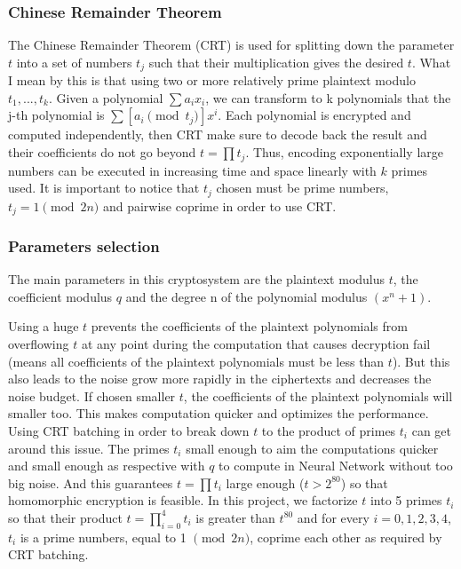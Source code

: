 \documentclass[A4paper,12pt]{article}
\begin{document}
	\subsubsection{Chinese Remainder Theorem}
	
The Chinese Remainder Theorem (CRT)\cite{report} is used for splitting down the parameter $t$ into a set of numbers $t_j$ such that their multiplication gives the desired $t$. What I mean by this is that using two or more relatively prime plaintext modulo $t_1, ..., t_k$. Given a polynomial $\sum a_i x_i$, we can transform to k polynomials that the j-th polynomial is $\sum [a_i \pmod {t_j}]x^i$. Each polynomial is encrypted and computed independently, then CRT make sure to decode back the result and their coefficients do not go beyond $t = \prod {t_j}$. Thus, encoding exponentially large numbers can be executed in increasing time and space linearly with $k$ primes used. It is important to notice that $t_j$ chosen must be prime numbers, $t_j = 1 \pmod {2n}$ and pairwise coprime in order to use CRT.
	

	\subsubsection{Parameters selection}
The main parameters in this cryptosystem are the plaintext modulus $t$, the coefficient modulus $q$ and the degree n of the polynomial modulus $(x^n + 1)$.

Using a huge $t$ prevents the coefficients of the plaintext polynomials from overflowing $t$ at any point during the computation that causes decryption fail (means all coefficients of the plaintext polynomials must be less than $t$). But this also leads to the noise grow more rapidly in the ciphertexts and decreases the noise budget. If chosen smaller $t$, the coefficients of the plaintext polynomials will smaller too. This makes computation quicker and optimizes the performance. Using CRT batching in order to break down $t$ to the product of primes $t_i$ can get around this issue. The primes $t_i$ small enough to aim the computations quicker and small enough as respective with $q$ to compute in Neural Network without too big noise. And this guarantees $t = \prod t_i$ large enough ($t > 2^{80}$) so that homomorphic encryption is feasible. In this project, we factorize $t$ into 5 primes $t_i$ so that their product $t = \prod_{i=0}^{4}t_i$ is greater than $t^{80}$ and for every $i = 0,1,2,3,4$, $t_i$ is a prime numbers, equal to 1 $\pmod {2n}$, coprime each other as required by CRT batching.
\end{document}
